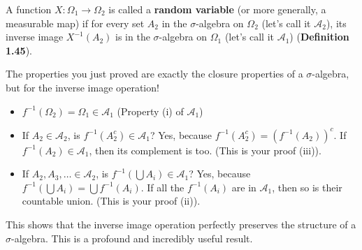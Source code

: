 \documentclass[11pt,a4paper]{article}
\begin{document}
\begin{itemize}
    A function $X: \Omega_1 \to \Omega_2$ is called a \textbf{random variable} (or more generally, a measurable map) if for every set $A_2$ in the $\sigma$-algebra on $\Omega_2$ (let's call it $\mathcal{A}_2$), its inverse image $X^{-1}(A_2)$ is in the $\sigma$-algebra on $\Omega_1$ (let's call it $\mathcal{A}_1$) (\textbf{Definition 1.45}).

    The properties you just proved are exactly the closure properties of a $\sigma$-algebra, but for the inverse image operation!
    \begin{itemize}
        \item $f^{-1}(\Omega_2) = \Omega_1 \in \mathcal{A}_1$ (Property (i) of $\mathcal{A}_1$)
        \item If $A_2 \in \mathcal{A}_2$, is $f^{-1}(A_2^c) \in \mathcal{A}_1$? Yes, because $f^{-1}(A_2^c) = (f^{-1}(A_2))^c$. If $f^{-1}(A_2) \in \mathcal{A}_1$, then its complement is too. (This is your proof (iii)).
        \item If $A_2, A_3, \dots \in \mathcal{A}_2$, is $f^{-1}(\bigcup A_i) \in \mathcal{A}_1$? Yes, because $f^{-1}(\bigcup A_i) = \bigcup f^{-1}(A_i)$. If all the $f^{-1}(A_i)$ are in $\mathcal{A}_1$, then so is their countable union. (This is your proof (ii)).
    \end{itemize}
    This shows that the inverse image operation perfectly preserves the structure of a $\sigma$-algebra. This is a profound and incredibly useful result.
\end{itemize}
\end{document}
